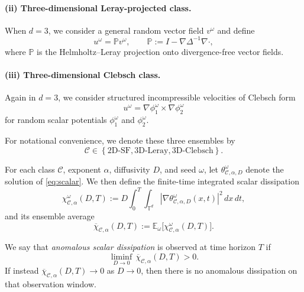 \paragraph{(ii) Three-dimensional Leray-projected class.}
When $d=3$, we consider a general random vector field $v^\omega$ and define
\begin{equation}
u^\omega = \mathbb{P}v^\omega,
\qquad
\mathbb{P} := I - \nabla \Delta^{-1}\nabla\cdot,
\label{eq:leray}
\end{equation}
where $\mathbb{P}$ is the Helmholtz--Leray projection onto divergence-free vector fields.

\paragraph{(iii) Three-dimensional Clebsch class.}
Again in $d=3$, we consider structured incompressible velocities of Clebsch form
\begin{equation}
u^\omega = \nabla \phi_1^\omega \times \nabla \phi_2^\omega
\label{eq:clebsch}
\end{equation}
for random scalar potentials $\phi_1^\omega$ and $\phi_2^\omega$.

For notational convenience, we denote these three ensembles by
\[
\mathcal{C}\in
\left\{
\mathrm{2D\text{-}SF},
\mathrm{3D\text{-}Leray},
\mathrm{3D\text{-}Clebsch}
\right\}.
\]

For each class $\mathcal{C}$, exponent $\alpha$, diffusivity $D$, and seed $\omega$, let $\theta^{\omega}_{\mathcal{C},\alpha,D}$ denote the solution of \eqref{eq:scalar}. We then define the finite-time integrated scalar dissipation
\begin{equation}
\chi^{\omega}_{\mathcal{C},\alpha}(D,T)
:=
D \int_0^T \int_{\mathbb{T}^d}
|\nabla \theta^{\omega}_{\mathcal{C},\alpha,D}(x,t)|^2
\,dx\,dt,
\label{eq:chi}
\end{equation}
and its ensemble average
\begin{equation}
\overline{\chi}_{\mathcal{C},\alpha}(D,T)
:=
\mathbb{E}_\omega
\bigl[
\chi^{\omega}_{\mathcal{C},\alpha}(D,T)
\bigr].
\label{eq:chibar}
\end{equation}

We say that \emph{anomalous scalar dissipation} is observed at time horizon $T$ if
\begin{equation}
\liminf_{D\to0}\,
\overline{\chi}_{\mathcal{C},\alpha}(D,T) > 0.
\label{eq:anomalous}
\end{equation}
If instead $\overline{\chi}_{\mathcal{C},\alpha}(D,T)\to0$ as $D\to0$, then there is no anomalous dissipation on that observation window.

